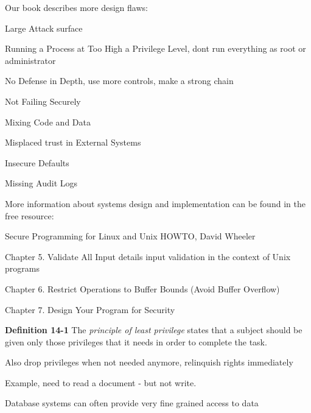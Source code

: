 \documentclass[Screen16to9,17pt]{foils}
\begin{document}

Our book describes more design flaws:
\begin{list2}
\item Large Attack surface
\item Running a Process at Too High a Privilege Level, dont run everything as root or administrator
\item No Defense in Depth, use more controls, make a strong chain
\item Not Failing Securely
\item Mixing Code and Data
\item Misplaced trust in External Systems
\item Insecure Defaults
\item Missing Audit Logs
\end{list2}


\begin{list1}
\item More information about systems design and implementation can be found in the free resource:
\item Secure Programming for Linux and Unix HOWTO, David Wheeler
\item {}
\item Chapter 5. Validate All Input details input validation in the context of Unix programs
\item Chapter 6. Restrict Operations to Buffer Bounds (Avoid Buffer Overflow)
\item Chapter 7. Design Your Program for Security
\end{list1}



\begin{list1}
\item {\bf Definition 14-1} The \emph{principle of least privilege} states that a subject should be given only those privileges that it needs in order to complete the task.
\item Also drop privileges when not needed anymore, relinquish rights immediately
\item Example, need to read a document - but not write.
\item Database systems can often provide very fine grained access to data
\end{list1}
\end{document}

